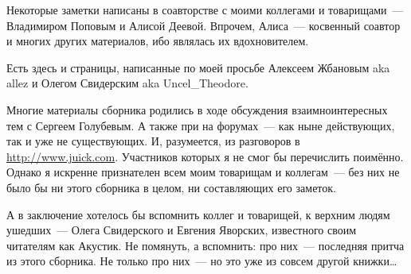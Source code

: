 Некоторые заметки написаны в соавторстве с моими коллегами и товарищами~--- Владимиром Поповым и Алисой Деевой. Впрочем, Алиса~--- косвенный соавтор и многих других материалов, ибо являлась их вдохновителем.

Есть здесь и страницы, написанные по моей просьбе Алексеем Жбановым aka allez и Олегом Свидерским aka Uncel\_Theodore. 

Многие материалы сборника родились в ходе обсуждения взаимноинтересных тем с Сергеем Голубевым. А также при на форумах~--- как ныне действующих, так и уже не существующих. И, разумеется, из разговоров в \href{Джуйке}{http://www.juick.com}. Участников которых я не смог бы перечислить поимённо. Однако я искренне признателен всем моим товарищам и коллегам~--- без них не было бы ни этого сборника в целом, ни составляющих его заметок.

А в заключение хотелось бы вспомнить коллег и товарищей, к верхним людям ушедших~--- Олега Свидерского и Евгения Яворских, известного своим читателям как Акустик. Не помянуть, а вспомнить: про них~--- последняя притча из этого сборника. Не только про них~--- но это уже из совсем другой книжки\dots